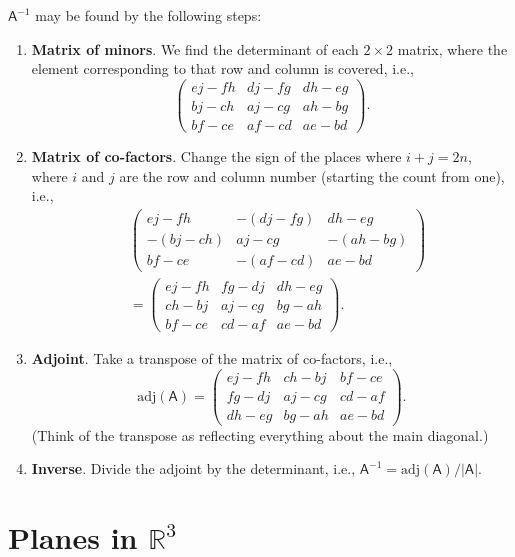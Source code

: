 \documentclass[letter-paper]{tufte-book}
\newcommand\Def[1]{\textbf{#1}}
\begin{document}
$\mathsf{A}^{-1}$ may be found by the following steps:
\begin{enumerate}
	\item \Def{Matrix of minors}. We find the determinant of each
	$2\times2$ matrix, where the element corresponding to that row and column is
	covered, i.e.,
	\begin{equation*}
		\begin{pmatrix}ej-fh & dj-fg & dh-eg\\ bj-ch & aj-cg & ah-bg\\
		bf-ce & af-cd & ae-bd
		\end{pmatrix}.
	\end{equation*}
	\item \Def{Matrix of co-factors}. Change the sign of the places where
	$i+j=2n$, where $i$ and $j$ are the row and column number (starting the
	count from one), i.e.,
	\begin{align*}
		&\begin{pmatrix}ej-fh & -(dj-fg) & dh-eg\\ -(bj-ch) & aj-cg & -(ah-bg)\\
		bf-ce & -(af-cd) & ae-bd
		\end{pmatrix}\\
		&= \begin{pmatrix}ej-fh & fg-dj & dh-eg\\ ch-bj & aj-cg & bg-ah\\
		bf-ce & cd-af & ae-bd
		\end{pmatrix}.
	\end{align*}
	\item \Def{Adjoint}. Take a transpose of the matrix of co-factors,
	i.e.,
	\begin{equation*}
		\mbox{adj}(\mathsf{A})=\begin{pmatrix}ej-fh & ch-bj & bf-ce \\ 
		fg-dj & aj-cg & cd-af\\ dh-eg & bg-ah & ae-bd
		\end{pmatrix}.
	\end{equation*}
	(Think of the transpose as reflecting everything about the main diagonal.)
	\item \Def{Inverse}. Divide the adjoint by the determinant, i.e.,
	$\mathsf{A}^{-1}=\mbox{adj}(\mathsf{A})/|\mathsf{A}|$.
\end{enumerate}


\section{Planes in $\mathbb{R}^3$}
\end{document}

